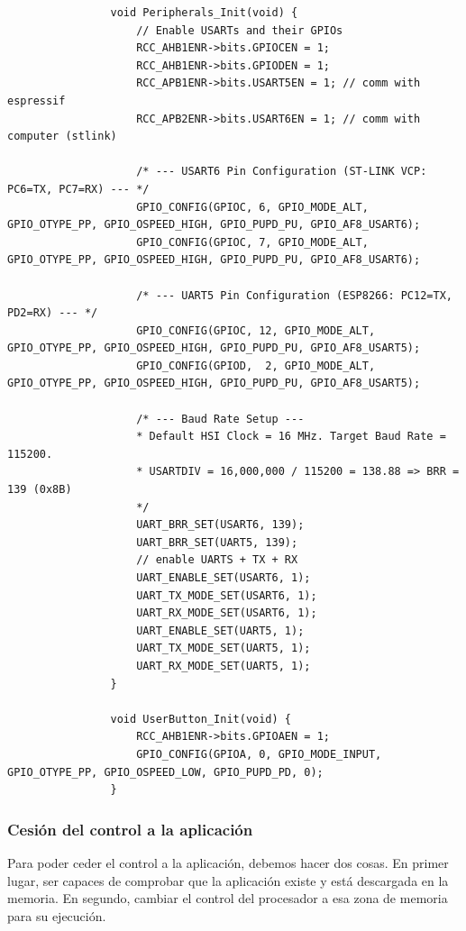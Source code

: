 \documentclass[../main.tex]{subfiles}
\begin{document}
            \begin{lstlisting}
                void Peripherals_Init(void) {
                    // Enable USARTs and their GPIOs
                    RCC_AHB1ENR->bits.GPIOCEN = 1;
                    RCC_AHB1ENR->bits.GPIODEN = 1;
                    RCC_APB1ENR->bits.USART5EN = 1;	// comm with espressif
                    RCC_APB2ENR->bits.USART6EN = 1; // comm with computer (stlink)

                    /* --- USART6 Pin Configuration (ST-LINK VCP: PC6=TX, PC7=RX) --- */
                    GPIO_CONFIG(GPIOC, 6, GPIO_MODE_ALT, GPIO_OTYPE_PP, GPIO_OSPEED_HIGH, GPIO_PUPD_PU, GPIO_AF8_USART6);
                    GPIO_CONFIG(GPIOC, 7, GPIO_MODE_ALT, GPIO_OTYPE_PP, GPIO_OSPEED_HIGH, GPIO_PUPD_PU, GPIO_AF8_USART6);

                    /* --- UART5 Pin Configuration (ESP8266: PC12=TX, PD2=RX) --- */
                    GPIO_CONFIG(GPIOC, 12, GPIO_MODE_ALT, GPIO_OTYPE_PP, GPIO_OSPEED_HIGH, GPIO_PUPD_PU, GPIO_AF8_USART5);
                    GPIO_CONFIG(GPIOD,  2, GPIO_MODE_ALT, GPIO_OTYPE_PP, GPIO_OSPEED_HIGH, GPIO_PUPD_PU, GPIO_AF8_USART5);

                    /* --- Baud Rate Setup ---
                    * Default HSI Clock = 16 MHz. Target Baud Rate = 115200.
                    * USARTDIV = 16,000,000 / 115200 = 138.88 => BRR = 139 (0x8B)
                    */
                    UART_BRR_SET(USART6, 139);
                    UART_BRR_SET(UART5, 139);
                    // enable UARTS + TX + RX
                    UART_ENABLE_SET(USART6, 1);
                    UART_TX_MODE_SET(USART6, 1);
                    UART_RX_MODE_SET(USART6, 1);
                    UART_ENABLE_SET(UART5, 1);
                    UART_TX_MODE_SET(UART5, 1);
                    UART_RX_MODE_SET(UART5, 1);
                }

                void UserButton_Init(void) {
                    RCC_AHB1ENR->bits.GPIOAEN = 1;
                    GPIO_CONFIG(GPIOA, 0, GPIO_MODE_INPUT, GPIO_OTYPE_PP, GPIO_OSPEED_LOW, GPIO_PUPD_PD, 0);
                }
            \end{lstlisting}

        \subsubsection{Cesión del control a la aplicación}

            Para poder ceder el control a la aplicación, debemos hacer dos cosas. En primer lugar, ser capaces de comprobar que la aplicación existe y está descargada en la memoria. En segundo, cambiar el control del procesador a esa zona de memoria para su ejecución.
\end{document}

